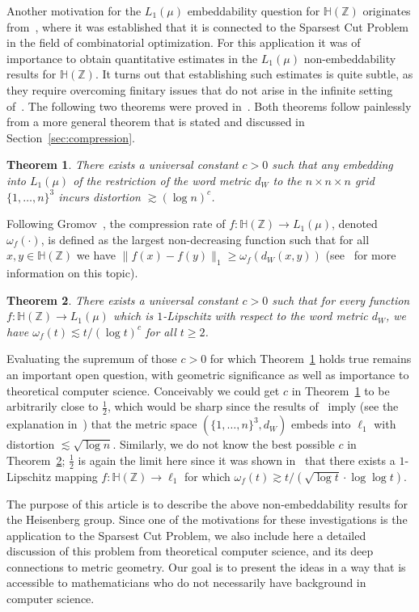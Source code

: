 \documentclass{icm2010}
\newtheorem{theorem}{Theorem}[section]
\theoremstyle{definition}
\newcommand{\1}{\mathbf{1}}
\renewcommand{\H}{\mathbb{H}}
\newcommand{\Z}{\mathbb{Z}}
\renewcommand{\ge}{\geqslant}
\begin{document}
Another motivation for the $L_1(\mu)$ embeddability question for
$\H(\Z)$ originates from~\cite{LN06}, where it was established that
it is connected to the Sparsest Cut Problem in the field of
combinatorial optimization. For this application it was of
importance to obtain quantitative estimates in the $L_1(\mu)$
non-embeddability results for $\H(\Z)$. It turns out that
establishing such estimates is quite subtle, as they require
overcoming finitary issues that do not arise in the infinite setting
of~\cite{ckbv,ckmetmon}. The following two theorems were proved
in~\cite{ckn,CKN09}. Both theorems follow painlessly from a more
general theorem that is stated and discussed in
Section~\ref{sec:compression}.
\begin{theorem}\label{thm:ckn}
There exists a universal constant $c>0$ such that any
embedding into $L_1(\mu)$ of the restriction of the word metric
$d_W$ to the $n\times n\times n$ grid $\{1,\ldots,n\}^3$ incurs
distortion $\gtrsim (\log n)^c$.
\end{theorem}
Following Gromov~\cite{Gro93}, the compression rate of $f:\H(\Z)\to
L_1(\mu)$, denoted $\omega_f(\cdot)$, is defined as the largest
non-decreasing function such that for all $x,y\in \H(\Z)$ we have
$\|f(x)-f(y)\|_1\ge \omega_f(d_W(x,y))$ (see~\cite{ADS06} for more
information on this topic).
\begin{theorem}\label{thm:rate} There exists a universal constant
$c>0$ such that for every function $f:\H(\Z)\to L_1(\mu)$ which is
$1$-Lipschitz with respect to the word metric $d_W$, we have
$\omega_f(t)\lesssim t/(\log t)^c$ for all $t\ge 2$.
\end{theorem}
 Evaluating the supremum of those $c>0$ for which
Theorem~\ref{thm:ckn} holds true remains an important open question,
with geometric significance as well as importance to theoretical
computer science. Conceivably we could get $c$ in
Theorem~\ref{thm:ckn} to be arbitrarily close to $\frac12$, which
would be sharp since the results of~\cite{Ass83,Rao99} imply (see
the explanation in~\cite{GKL03}) that the metric space
$\left(\{1,\ldots,n\}^3,d_W\right)$ embeds into $\ell_1$ with
distortion $\lesssim \sqrt{\log n}$. Similarly, we do not know the
best possible $c$ in Theorem~\ref{thm:rate}; $\frac12$ is again the
limit here since it was shown in~\cite{Tess08} that there exists a
$1$-Lipschitz mapping $f:\H(\Z)\to \ell_1$ for which
$\omega_f(t)\gtrsim t/(\sqrt{\log t}\cdot \log \log t)$.



The purpose of this article is to describe the above non-embeddability
results for the Heisenberg group. Since one of the motivations
for these investigations is the application to the Sparsest Cut
Problem, we also include here a detailed discussion of this problem
from theoretical computer science, and its deep connections to
 metric geometry. Our goal is to present the ideas in
a way that is accessible to mathematicians who do not necessarily have
background in computer science.
\end{document}
